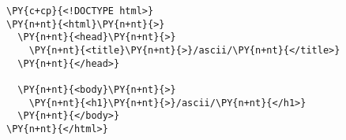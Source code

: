 \begin{Verbatim}[commandchars=\\\{\}]
\PY{c+cp}{<!DOCTYPE html>}
\PY{n+nt}{<html}\PY{n+nt}{>}
  \PY{n+nt}{<head}\PY{n+nt}{>}
    \PY{n+nt}{<title}\PY{n+nt}{>}/ascii/\PY{n+nt}{</title>}
  \PY{n+nt}{</head>}

  \PY{n+nt}{<body}\PY{n+nt}{>}
    \PY{n+nt}{<h1}\PY{n+nt}{>}/ascii/\PY{n+nt}{</h1>}
  \PY{n+nt}{</body>}
\PY{n+nt}{</html>}
\end{Verbatim}
